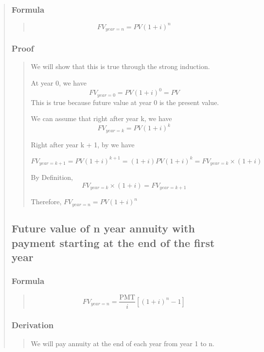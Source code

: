 \documentclass{article} %
\begin{document}
\begin{quote}
    \subsubsection{Formula}
    \begin{quote}
        \[
            FV_{year = n} = PV (1 + i)^n
        \]
    \end{quote}
    \subsubsection{Proof}
    \begin{quote}
        We will show that this is true through the strong induction.

        At year 0, we have
        \[
            FV_{year = 0} = PV (1 + i)^{0} = PV
        \]
        This is true because future value at year 0 is the present value.

        We can assume that right after year k, we have
        \[
            FV_{year = k} = PV (1 + i)^{k}
        \]

        Right after year k + 1, by we have

        \[
            FV_{year = k + 1} = PV (1 + i)^{k + 1} = (1 + i)PV(1 + i)^{k} = FV_{year = k} \times (1 + i)
        \]

        By Definition,
        \[
            FV_{year = k} \times (1 + i) = FV_{year = k + 1}
        \]

        Therefore, $FV_{year = n} = PV (1 + i)^n$

    \end{quote}

    \subsection{Future value of n year annuity with payment starting at the end of the first year}
    \subsubsection{Formula}
    \begin{quote}
        \[
            FV_{year = n} = \frac{\text{PMT}}{i}\left[(1 + i)^n - 1\right]
        \]
    \end{quote}
    \subsubsection{Derivation}
    \begin{quote}
        We will pay annuity at the end of each year from year 1 to n.


\end{quote}
\end{quote}
\end{document}
